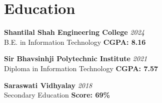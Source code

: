 \documentclass[10pt,a4paper]{article}
\begin{document}
\section{Education}

\textbf{Shantilal Shah Engineering College} \hfill \textit{2024} \\
B.E. in Information Technology \hfill \textbf{CGPA: 8.16}

\textbf{Sir Bhavsinhji Polytechnic Institute} \hfill \textit{2021} \\
Diploma in Information Technology \hfill \textbf{CGPA: 7.57}

\textbf{Saraswati Vidhyalay} \hfill \textit{2018} \\
Secondary Education \hfill \textbf{Score: 69\%}
\end{document}
